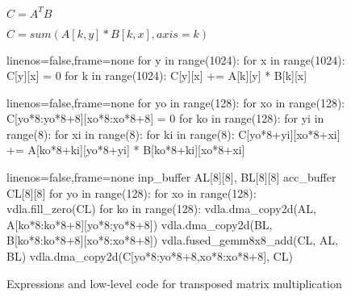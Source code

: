 \begin{figure}
	\begin{minipage}[b]{.45\textwidth}
		\small
		\centering
		\begin{minipage}{\textwidth}
			\begin{center}
				$ C = A^{T}B $
			\end{center}
			\unskip
			\label{fig:expr-sched-example-1}
		\end{minipage}
		\begin{minipage}{\textwidth}
		\begin{center}
			\bigskip
			$ C = sum(A[k, y] * B[k, x], axis=k) $
		\end{center}
		\end{minipage}
		\label{fig:expr-sched-example-2}
	\end{minipage}%
	\hfill
	\scriptsize
	\begin{minipage}[b]{.5\textwidth}
		\centering
		\begin{pythoncode*}{linenos=false,frame=none}
for y in range(1024):
  for x in range(1024):
    C[y][x] = 0
    for k in range(1024):
      C[y][x] += A[k][y] * B[k][x]
		\end{pythoncode*}
		\unskip
		\label{fig:expr-sched-example-3}
	\end{minipage}
	\begin{minipage}[b]{.4\textwidth}
		\centering
		\bigskip
		\begin{pythoncode*}{linenos=false,frame=none}
for yo in range(128):
  for xo in range(128):
    C[yo*8:yo*8+8][xo*8:xo*8+8] = 0
    for ko in range(128):
      for yi in range(8):
        for xi in range(8):
          for ki in range(8):
            C[yo*8+yi][xo*8+xi] +=
              A[ko*8+ki][yo*8+yi]
                * B[ko*8+ki][xo*8+xi]
		\end{pythoncode*}
		\unskip
		\label{fig:expr-sched-example-4}
	\end{minipage}
	\hfill
	\begin{minipage}[b]{.6\textwidth}
		\centering
		\bigskip
		\begin{pythoncode*}{linenos=false,frame=none}
inp_buffer AL[8][8], BL[8][8]
acc_buffer CL[8][8]
for yo in range(128):
  for xo in range(128):
    vdla.fill_zero(CL)
    for ko in range(128):
      vdla.dma_copy2d(AL, A[ko*8:ko*8+8][yo*8:yo*8+8])
      vdla.dma_copy2d(BL, B[ko*8:ko*8+8][xo*8:xo*8+8])
      vdla.fused_gemm8x8_add(CL, AL, BL)
    vdla.dma_copy2d(C[yo*8:yo*8+8,xo*8:xo*8+8], CL)
		\end{pythoncode*}
		\unskip
		\label{fig:expr-sched-example-5}
	\end{minipage}
	\caption[Expressions and low-level code for transposed matrix multiplication]{Expressions and low-level code for transposed matrix multiplication~\cite[p.~4]{Chen.2018b}}
	\label{fig:expr-sched-example}
\end{figure}


